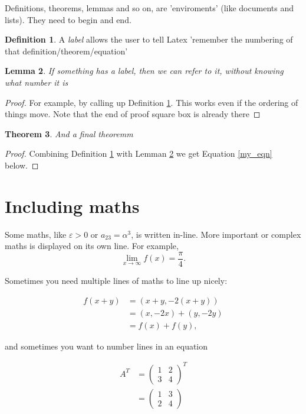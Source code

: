 \documentclass[a4paper,11pt]{article}
\newtheorem{theorem}{Theorem}[section]
\newtheorem{lemma}[theorem]{Lemma}
\theoremstyle{definition}
\newtheorem{definition}[theorem]{Definition}
\begin{document}
Definitions, theorems, lemmas and so on, are 'enviroments' (like documents and lists). They need to begin and end.

\begin{definition}\label{my_def}
	A \emph{label} allows the user to tell Latex 'remember the numbering of that definition/theorem/equation'
\end{definition}

\begin{lemma} \label{my_lem}
	If something has a label, then we can refer to it, without knowing what number it is 
\end{lemma}

\begin{proof}
	For example, by calling up Definition \ref{my_def}. This works even if the ordering of things move.
	Note that the end of proof square box is already there
\end{proof}

\begin{theorem}
	And a final theoremm
\end{theorem}

\begin{proof}
	Combining Definition \ref{my_def} with Lemman \ref{my_lem} we get Equation \ref{my_eqn} below.
\end{proof}

\section{Including maths}

Some maths, like $\varepsilon>0$ or $a_{23}=\alpha^3$, is written in-line. More important or complex maths is displayed on its own line.
For example, $$ \lim_{x\to\infty}f(x)=\frac{\pi}{4}.$$

Sometimes you need multiple lines of maths to line up nicely:

\begin{align*}
f(x+y)&=(x+y,-2(x+y))\\
&=(x,-2x)+(y,-2y)\\
&=f(x)+f(y),
\end{align*}

and sometimes you want to number lines in an equation

\begin{align}
A^{T} & =\begin{pmatrix}1 & 2\\
3 & 4
\end{pmatrix}^{T}\\
\label{my_eqn}  & =\begin{pmatrix}1 & 3\\
2 & 4
\end{pmatrix}
\end{align}
\end{document}
